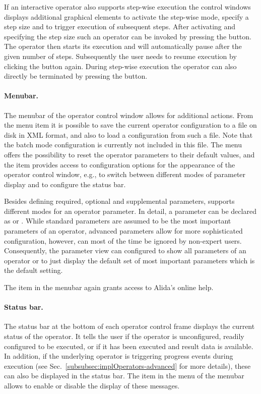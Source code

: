 If an interactive operator also supports step-wise execution the control windows displays
additional graphical elements to activate the step-wise mode, specify a step size and to trigger
execution of subsequent steps. After activating  and specifying the step size such an operator
can be invoked by pressing the  button. The operator then starts its execution
and will automatically pause after the given number of steps. Subsequently the user needs to resume
execution by clicking the button  again. During step-wise execution the operator
can also directly be terminated by pressing the  button. 
 
\paragraph{Menubar.} The menubar of the operator control window allows for
additional actions. From the menu item  it is possible to save the
current operator configuration to a file on disk in XML format, and also to load
a configuration from such a file. Note that the batch mode configuration is
currently not included in this file. The  menu offers the possibility to reset
the operator parameters to their default values, and the item 
provides access to configuration options for the appearance of the operator control window, e.g., to
switch between different modes of parameter display and to configure the status bar.

Besides defining required, optional and supplemental parameters, \alida supports different modes for
an operator parameter. In detail, a parameter can be declared as  or
.
While standard parameters are assumed to be the most important parameters of an operator,
advanced parameters allow for more sophisticated configuration, however, can
most of the time be ignored by non-expert users. Consequently, the parameter
view can configured to show all parameters of an operator or to just display the default set of
most important parameters which is the default setting. 

The item  in the menubar again grants access to
Alida's online help.

\paragraph{Status bar.} The status bar at the bottom of each operator control
frame displays the current status of the operator. It tells the user if the operator is
unconfigured, readily configured to be executed, or if it has been executed and result data is
available. In addition, if the underlying operator is triggering progress events during
execution (see Sec.~\ref{subsubsec:implOperators-advanced} for more details),
these can also be displayed in the status bar. The item  in the
 menu of the menubar allows to enable or disable the display of these messages.

